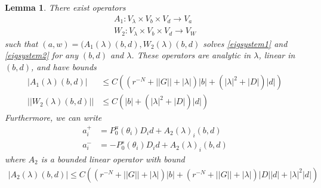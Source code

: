 \documentclass[12pt]{article}
\newtheorem{lemma}{Lemma}
\begin{document}
\begin{lemma}\label{eiginv2}
There exist operators 
\begin{align*}
A_1 : V_\lambda \times V_b \times V_d \rightarrow V_a \\
W_2 : V_\lambda \times V_b \times V_d \rightarrow V_W
\end{align*}
such that $(a, w) = (A_1(\lambda)(b,d), W_2(\lambda)(b,d)$ solves \eqref{eigsystem1} and \eqref{eigsystem2} for any $(b, d)$ and $\lambda$. These operators are analytic in $\lambda$, linear in $(b,d)$, and have bounds 
\begin{align}
|A_1(\lambda)(b, d)| &\leq C \left( (r^{-N} + ||G|| + |\lambda| ) |b| + (|\lambda|^2 + |D| ) |d| \right) \label{A1bound} \\
||W_2(\lambda)(b,d)|| &\leq C \left( |b| + (|\lambda|^2 + |D|) |d| \right) \label{W2bound}
\end{align}
Furthermore, we can write
\begin{align*}
a_i^+ &= P_0^u(\theta_i) D_i d + A_2(\lambda)_i(b,d) \\
a_i^- &= -P_0^s(\theta_i) D_i d + A_2(\lambda)_i(b,d)
\end{align*}
where $A_2$ is a bounded linear operator with bound
\begin{align}\label{A2bound}
|A_2(\lambda)(b,d)| \leq 
C\left( (r^{-N} + ||G|| + |\lambda| )|b| + (r^{-N} + ||G|| + |\lambda|)|D||d| + |\lambda|^2 |d|  \right)
\end{align}


\end{lemma}
\end{document}
